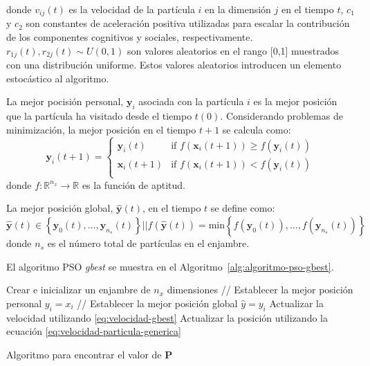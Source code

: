 \documentclass{article}
\begin{document}
donde  $v_{ij}(t)$ es la velocidad de la partícula $i$ en la dimensión $j$ en el tiempo $t$, $c_1$ y $c_2$ son constantes de aceleración positiva utilizadas para escalar la contribución de los componentes cognitivos y sociales, respectivamente.
$r_{1j}(t), r_{2j}(t) \sim U(0,1)$ son valores aleatorios en el rango [0,1] muestrados con una distribución uniforme.
Estos valores aleatorios introducen un elemento estocástico al algoritmo.

La mejor pocisión personal, $\mathbf{y}_i$ asociada con la partícula $i$ es la mejor posición que la partícula ha visitado desde el tiempo $t(0)$.
Considerando problemas de minimización, la mejor posición en el tiempo $t+1$ se calcula como:
\begin{equation}
\mathbf{y}_i(t+1) = \begin{cases}
               \mathbf{y}_i(t)	& \text{if } f(\mathbf{x}_i(t+1)) \geq f(\mathbf{y}_i(t))\\
               \mathbf{x}_i(t+1)	& \text{if } f(\mathbf{x}_i(t+1)) < f(\mathbf{y}_i(t))\\
           \end{cases}	
\end{equation}
donde $f: \mathbb{R}^{n_x} \to \mathbb{R}$ es la función de aptitud.

La mejor posición global, $\mathbf{\hat{y}}(t)$, en el tiempo $t$ se define como:
$$
\mathbf{\hat{y}}(t) \in \left \{ \mathbf{y}_0(t), \ldots, \mathbf{y}_{n_s}(t) \right \} | | f(\mathbf{\hat{y}}(t)) = \text{min} \left \{ f(\mathbf{y}_0(t)),\ldots,f(\mathbf{y}_{n_s}(t)) \right \}
$$
donde $n_s$ es el número total de partículas en el enjambre.

El algoritmo PSO \emph{gbest} se muestra en el Algoritmo~\ref{alg:algoritmo-pso-gbest}.

\begin{algorithm} 
\begin{algorithmic}[1] 
\STATE Crear e inicializar un enjambre de $n_x$ dimensiones
\REPEAT
		\STATE // Establecer la mejor posición personal
			\STATE $y_i = x_i$
		\ENDIF
		\STATE // Establecer la mejor posición global 
			\STATE $\hat{y} = y_i$
		\ENDIF
	\ENDFOR
		\STATE Actualizar la velocidad utilizando \ref{eq:velocidad-gbest}
		\STATE Actualizar la posición utilizando la ecuación \ref{eq:velocidad-particula-generica}
	\ENDFOR
{}
\end{algorithmic} 
\caption{Algoritmo para encontrar el valor de $\mathbf{P}$} 
\label{alg:algoritmo-pso-gbest}
\end{algorithm}
\end{document}
